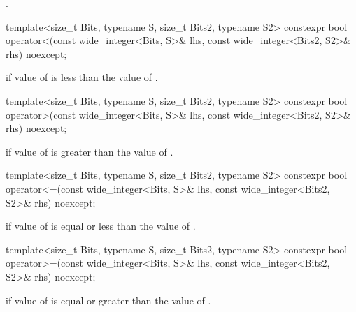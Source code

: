\begin{itemdescr}
\returns {}.
\end{itemdescr}

\begin{itemdecl}
template<size_t Bits, typename S, size_t Bits2, typename S2>
  constexpr bool operator<(const wide_integer<Bits, S>& lhs,
                           const wide_integer<Bits2, S2>& rhs) noexcept;
\end{itemdecl}

\begin{itemdescr}
\returns {} if value of  is less than the value of .
\end{itemdescr}

\begin{itemdecl}
template<size_t Bits, typename S, size_t Bits2, typename S2>
  constexpr bool operator>(const wide_integer<Bits, S>& lhs,
                           const wide_integer<Bits2, S2>& rhs) noexcept;
\end{itemdecl}

\begin{itemdescr}
\returns {} if value of  is greater than the value of .
\end{itemdescr}

\begin{itemdecl}
template<size_t Bits, typename S, size_t Bits2, typename S2>
  constexpr bool operator<=(const wide_integer<Bits, S>& lhs,
                            const wide_integer<Bits2, S2>& rhs) noexcept;
\end{itemdecl}

\begin{itemdescr}
\returns {} if value of  is equal or less than the value of .
\end{itemdescr}

\begin{itemdecl}
template<size_t Bits, typename S, size_t Bits2, typename S2>
  constexpr bool operator>=(const wide_integer<Bits, S>& lhs,
                            const wide_integer<Bits2, S2>& rhs) noexcept;
\end{itemdecl}

\begin{itemdescr}
\returns {} if value of  is equal or greater than the value of .
\end{itemdescr}

